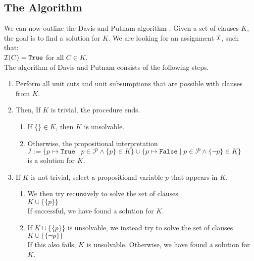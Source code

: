 \subsection{The Algorithm}
We can now outline the Davis and Putnam algorithm .
Given a set of clauses $K$, the goal is to find a solution for $K$. We
are looking for an assignment $\mathcal{I}$, such that: \\[0.2cm]
\hspace*{1.3cm} $\mathcal{I}(C) = \texttt{True}$ \quad for all $C \in K$.\\[0.2cm]
The algorithm of Davis and Putnam consists of the following steps.
\begin{enumerate}
\item Perform all unit cuts and unit subsumptions that are possible with clauses from $K$.
\item Then, If $K$ is trivial, the procedure ends.
     \begin{enumerate}
     \item If $\{\} \in K$, then $K$ is unsolvable.
     \item Otherwise, the propositional interpretation
           \\[0.2cm]
           \hspace*{1.3cm}
           $\mathcal{I} := \bigl\{ p \mapsto \mathtt{True}  \mid p \in \mathcal{P} \wedge \{p\}\in K\bigr\} \cup
                           \bigl\{ p \mapsto \mathtt{False} \mid p \in \mathcal{P} \wedge \{\neg p\}\in K\bigr\}  $
           \\[0.2cm]
           is a solution for $K$.     
     \end{enumerate}
\item If $K$ is not trivial, select a propositional variable $p$ that appears in $K$.
      \begin{enumerate}
      \item We then try recursively to solve the set of clauses \\[0.2cm]
            \hspace*{1.3cm}  $K \cup \bigl\{\{p\}\bigr\}$ \\[0.2cm]
            If successful, we have found a solution for $K$.
      \item If $K \cup \bigl\{\{p\}\bigr\}$ is unsolvable, we instead try to solve the set of clauses
            \\[0.2cm] 
            \hspace*{1.3cm} $K \cup \bigl\{\{\neg p\}\bigr\}$
            \\[0.2cm]
            If this also fails, $K$ is unsolvable. Otherwise,
            we have found a solution for $K$.
      \end{enumerate}
\end{enumerate}
